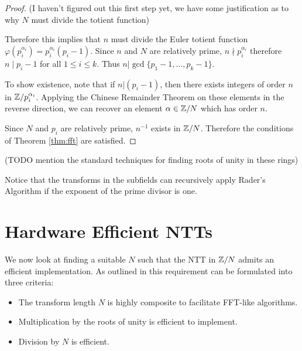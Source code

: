 \begin{proof}
    (I haven't figured out this first step yet, we have some justification as to why $N$ must divide the totient function)

    Therefore this implies that $n$ must divide the Euler totient function $\varphi(p_i^{\alpha_i}) = p_i^{\alpha_i}(p_i - 1)$. Since $n$ and $N$ are relatively prime, $n \nmid p_i^{\alpha_i}$ therefore $n \mid p_i - 1$ for all $1 \le i \le k$. Thus $n | \gcd\{p_1 - 1, \ldots, p_k - 1\}$.

    \medskip

    To show existence, note that if $n | (p_i - 1)$, then there exists integers of order $n$ in ${\mathbb Z}/p_i^{\alpha_i}$. Applying the Chinese Remainder Theorem on these elements in the reverse direction, we can recover an element $\alpha \in {\mathbb Z}/N$ which has order $n$.

    \medskip

    Since $N$ and $p_i$ are relatively prime, $n^{-1}$ exists in ${\mathbb Z}/N$. Therefore the conditions of Theorem \ref{thm:fft} are satisfied.
\end{proof}

(TODO mention the standard techniques for finding roots of unity in these rings)

Notice that the transforms in the subfields can recursively apply Rader's Algorithm if the exponent of the prime divisor is one.


\section{Hardware Efficient NTTs}%
\label{sec:hardware-efficient-ntt}

We now look at finding a suitable $N$ such that the NTT in ${\mathbb Z} / N$ admits an efficient implementation. As outlined in \cite{intro-to-fmt} this requirement can be formulated into three criteria:
\begin{itemize}
    \item The transform length $N$ is highly composite to facilitate FFT-like algorithms.
    \item Multiplication by the roots of unity is efficient to implement.
    \item Division by $N$ is efficient.
\end{itemize}


